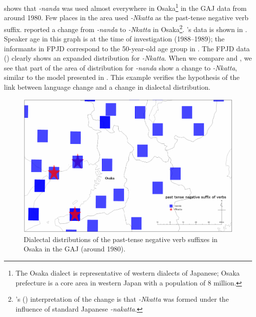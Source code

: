 \documentclass[output=paper]{LSP/langsci}
\begin{document}
 shows that \textit{-nanda} was used almost everywhere in Osaka\footnote{ The Osaka dialect is representative of western dialects of Japanese; Osaka prefecture is a core area in  western Japan with a population of 8 million.} in the GAJ data from around 1980. Few places in the area used \textit{{}-Nkatta} as the past-tense negative verb suffix. \citet{sanada_kansaihougen-no_1992} reported a change from \textit{-nanda} to \textit{-Nkatta} in Osaka\footnote{ \citeauthor{sanada_kansaihougen-no_1992}'s (\citeyear{sanada_kansaihougen-no_1992}) interpretation of the change is that \textit{-Nkatta} was formed under the influence of standard Japanese \textit{-nakatta}.}. \citeauthor{sanada_kansaihougen-no_1992}'s data is shown in  . Speaker age in this graph is at the time of investigation (1988--1989); the informants in FPJD correspond to the 50-year-old age group in \citet{sanada_kansaihougen-no_1992}. The FPJD data () clearly shows an expanded distribution for \textit{-Nkatta}. When we compare  and , we see that part of the area of distribution for \textit{-nanda} show a change to \textit{-Nkatta}, similar to the model presented in . This example verifies the hypothesis of the link between language change and a change in dialectal distribution.


\begin{figure}
\includegraphics[width=\textwidth]{illustrations/onishi_fig2}
\caption{Dialectal distributions of the past-tense negative verb suffixes in Osaka in the GAJ (around 1980).}
\label{fig:2}
\end{figure}
\end{document}
